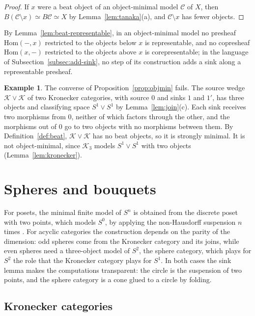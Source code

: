 \documentclass[12pt]{amsart}
\theoremstyle{definition}
\newtheorem{example}[teo]{Example}
\theoremstyle{remark}
\newcommand{\CC}{\mathcal{C}}
\newcommand{\Hom}{\mathrm{Hom}}
\newcommand{\K}{\mathcal{K}}
\begin{document}
\begin{proof}
If $x$ were a beat object of an object-minimal model $\CC$ of $X$, then $B(\CC\setminus x)\simeq B\CC\simeq X$ by Lemma~\ref{lem:tanaka}(a), and $\CC\setminus x$ has fewer objects.
\end{proof}

By Lemma~\ref{lem:beat-representable}, in an object-minimal model no presheaf $\Hom(-,x)$ restricted to the objects below $x$ is representable, and no copresheaf $\Hom(x,-)$ restricted to the objects above $x$ is corepresentable; in the language of Subsection~\ref{subsec:add-sink}, no step of its construction adds a sink along a representable presheaf.

\begin{example}\label{ex:converse}
The converse of Proposition~\ref{prop:objmin} fails. The source wedge $\K\vee\K$ of two Kronecker categories, with source $0$ and sinks $1$ and $1'$, has three objects and classifying space $S^1\vee S^1$ by Lemma~\ref{lem:join}(c). Each sink receives two morphisms from $0$, neither of which factors through the other, and the morphisms out of $0$ go to two objects with no morphisms between them. By Definition~\ref{def:beat}, $\K\vee\K$ has no beat objects, so it is strongly minimal. It is not object-minimal, since $\K_3$ models $S^1\vee S^1$ with two objects (Lemma~\ref{lem:kronecker}).
\end{example}

\section{Spheres and bouquets}\label{sec:bouquets}

For posets, the minimal finite model of $S^n$ is obtained from the discrete poset with two points, which models $S^0$, by applying the non-Hausdorff suspension $n$ times \cite{BarmakMinian2007}. For acyclic categories the construction depends on the parity of the dimension: odd spheres come from the Kronecker category and its joins, while even spheres need a three-object model of $S^2$, the sphere category, which plays for $S^2$ the role that the Kronecker category plays for $S^1$. In both cases the sink lemma makes the computations transparent: the circle is the suspension of two points, and the sphere category is a cone glued to a circle by folding.

\subsection{Kronecker categories}\label{subsec:kronecker}
\end{document}
